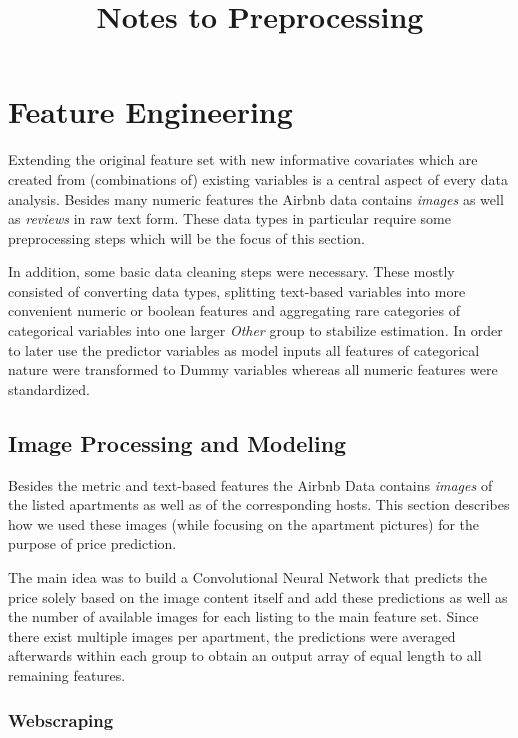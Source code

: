 \documentclass[12pt, letterpaper]{article}
\title{Notes to Preprocessing}
\author{}
\date{}
\begin{document}
\maketitle

\section{Feature Engineering}

Extending the original feature set with new informative covariates which are created from (combinations of) existing variables is a central aspect of every data analysis.
Besides many numeric features the Airbnb data contains \emph{images} as well as \emph{reviews} in raw text form.
These data types in particular require some preprocessing steps which will be the focus of this section.

In addition, some basic data cleaning steps were necessary.
These mostly consisted of converting data types, splitting text-based variables into more convenient numeric or boolean features and aggregating rare categories of categorical variables into one larger \emph{Other} group to stabilize estimation.
In order to later use the predictor variables as model inputs all features of categorical nature were transformed to Dummy variables whereas all numeric features were standardized.

\subsection{Image Processing and Modeling}

Besides the metric and text-based features the Airbnb Data contains \emph{images} of the listed apartments as well as of the corresponding hosts.
This section describes how we used these images (while focusing on the apartment pictures) for the purpose of price prediction.

The main idea was to build a Convolutional Neural Network that predicts the price solely based on the image content itself and add these predictions as well as the number of available images for each listing to the main feature set.
Since there exist multiple images per apartment, the predictions were averaged afterwards within each group to obtain an output array of equal length to all remaining features.

\subsubsection{Webscraping}
\end{document}
